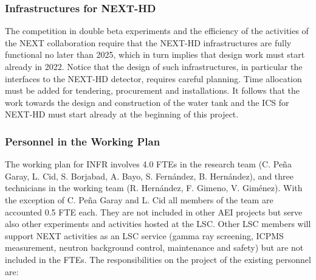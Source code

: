 \subsubsection*{Infrastructures for NEXT-HD}

The competition in double beta experiments and the efficiency of the activities of the NEXT collaboration require that the NEXT-HD infrastructures are fully functional no later than 2025, which in turn implies that design work must start already in 2022.  Notice that 
the design of such infrastructures, in particular the interfaces to the NEXT-HD detector, requires careful planning. Time allocation must be added for tendering, procurement and installations. It follows that the work towards the 
design and construction of the water tank and the ICS for NEXT-HD must start already at the beginning of this project.  

\subsubsection*{Personnel in the Working Plan}

The working plan for INFR involves 4.0 FTEs in the research team (C. Pe\~na Garay, L. Cid, S. Borjabad, A. Bayo, S. Fern\'andez, B. Hern\'andez), and three technicians in the working team (R. Hern\'andez, F. Gimeno, V. Gim\'enez). With the exception of C. Pe\~na Garay and L. Cid  all members of the team are accounted 0.5 FTE 
each. They are not included in other AEI projects but serve also other experiments and activities hosted at the LSC. Other LSC members 
will support NEXT activities as an LSC service (gamma ray screening, ICPMS measurement, neutron background control, maintenance 
and safety) but are not included in the FTEs. The responsibilities on the project of the existing personnel are:


